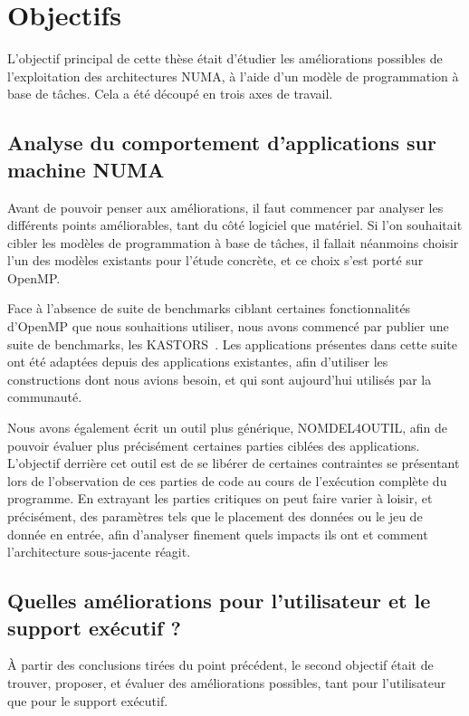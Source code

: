 \section{Objectifs}\label{sec:intro:objectives}

L'objectif principal de cette thèse était d'étudier les améliorations possibles de l'exploitation des architectures NUMA, à l'aide d'un modèle de programmation à base de tâches.
Cela a été découpé en trois axes de travail.


\subsection*{Analyse du comportement d'applications sur machine NUMA}

Avant de pouvoir penser aux améliorations, il faut commencer par analyser les différents points améliorables, tant du côté logiciel que matériel.
Si l'on souhaitait cibler les modèles de programmation à base de tâches, il fallait néanmoins choisir l'un des modèles existants pour l'étude concrète, et ce choix s'est porté sur OpenMP.

Face à l'absence de suite de benchmarks ciblant certaines fonctionnalités d'OpenMP que nous souhaitions utiliser, nous avons commencé par publier une suite de benchmarks, les KASTORS~\cite{Virouleau2014}.
Les applications présentes dans cette suite ont été adaptées depuis des applications existantes, afin d'utiliser les constructions dont nous avions besoin, et qui sont aujourd'hui utilisés par la communauté.

Nous avons également écrit un outil plus générique, NOMDEL4OUTIL, afin de pouvoir évaluer plus précisément certaines parties ciblées des applications.
L'objectif derrière cet outil est de se libérer de certaines contraintes se présentant lors de l'observation de ces parties de code au cours de l'exécution complète du programme.
En extrayant les parties critiques on peut faire varier à loisir, et précisément, des paramètres tels que le placement des données ou le jeu de donnée en entrée, afin d'analyser finement quels impacts ils ont et comment l'architecture sous-jacente réagit.


\subsection*{Quelles améliorations pour l'utilisateur et le support exécutif ?}

À partir des conclusions tirées du point précédent, le second objectif était de trouver, proposer, et évaluer des améliorations possibles, tant pour l'utilisateur que pour le support exécutif.

